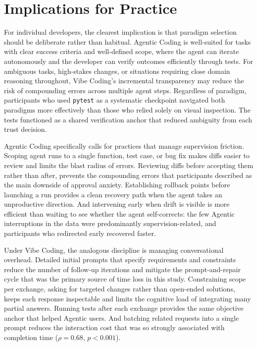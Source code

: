 \section{Implications for Practice}

\label{sec:disc-practice}

For individual developers, the clearest implication is that paradigm selection should be deliberate rather than habitual. Agentic Coding is well-suited for tasks with clear success criteria and well-defined scope, where the agent can iterate autonomously and the developer can verify outcomes efficiently through tests. For ambiguous tasks, high-stakes changes, or situations requiring close domain reasoning throughout, Vibe Coding's incremental transparency may reduce the risk of compounding errors across multiple agent steps. Regardless of paradigm, participants who used \texttt{pytest} as a systematic checkpoint navigated both paradigms more effectively than those who relied solely on visual inspection. The tests functioned as a shared verification anchor that reduced ambiguity from each trust decision.

Agentic Coding specifically calls for practices that manage supervision friction. Scoping agent runs to a single function, test case, or bug fix makes diffs easier to review and limits the blast radius of errors. Reviewing diffs before accepting them rather than after, prevents the compounding errors that participants described as the main downside of approval anxiety. Establishing rollback points before launching a run provides a clean recovery path when the agent takes an unproductive direction. And intervening early when drift is visible is more efficient than waiting to see whether the agent self-corrects: the few Agentic interruptions in the data were predominantly supervision-related, and participants who redirected early recovered faster.

Under Vibe Coding, the analogous discipline is managing conversational overhead. Detailed initial prompts that specify requirements and constraints reduce the number of follow-up iterations and mitigate the prompt-and-repair cycle that was the primary source of time loss in this study. Constraining scope per exchange, asking for targeted changes rather than open-ended solutions, keeps each response inspectable and limits the cognitive load of integrating many partial answers. Running tests after each exchange provides the same objective anchor that helped Agentic users. And batching related requests into a single prompt reduces the interaction cost that was so strongly associated with completion time ($\rho=0.68$, $p<0.001$).

